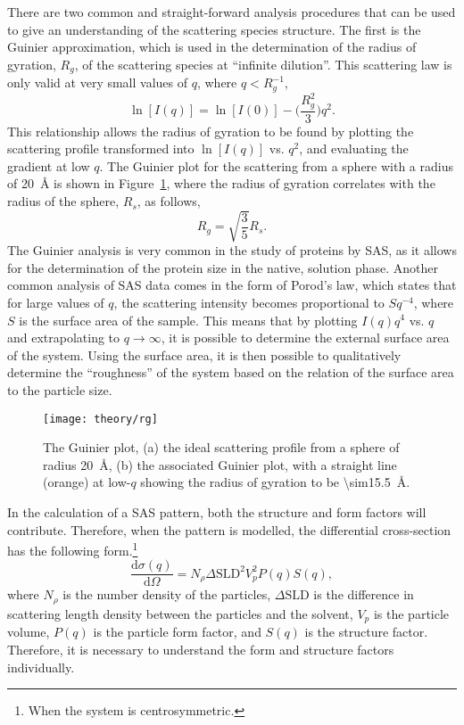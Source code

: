 There are two common and straight-forward analysis procedures that can be used to give an understanding of the scattering species structure.
The first is the Guinier approximation, which is used in the determination of the radius of gyration, $R_g$, of the scattering species at ``infinite dilution''.
This scattering law is only valid at very small values of $q$, where $q < R_g^{-1}$,\autocite{sivia_elementary_2011}
%
\begin{equation}
    \ln[I(q)] = \ln[I(0)] - \Bigg(\frac{R_g^2}{3}\Bigg)q^2.
\end{equation}
%
This relationship allows the radius of gyration to be found by plotting the scattering profile transformed into $\ln[I(q)]$ vs. $q^2$, and evaluating the gradient at low $q$.
The Guinier plot for the scattering from a sphere with a radius of \SI{20}{\angstrom} is shown in Figure~\ref{fig:rg}, where the radius of gyration correlates with the radius of the sphere, $R_s$, as follows,
%
\begin{equation}
    R_g = \sqrt{\frac{3}{5}}R_s.
\end{equation}
%
The Guinier analysis is very common in the study of proteins by SAS, as it allows for the determination of the protein size in the native, solution phase.\autocite{skou_synchrotron-based_2014}
Another common analysis of SAS data comes in the form of Porod's law, which states that for large values of $q$, the scattering intensity becomes proportional to $Sq^{-4}$, where $S$ is the surface area of the sample.
This means that by plotting $I(q)q^4$ vs. $q$ and extrapolating to $q \rightarrow \infty$, it is possible to determine the external surface area of the system.\autocite{willis_experimental_2009}
Using the surface area, it is then possible to qualitatively determine the ``roughness'' of the system based on the relation of the surface area to the particle size.
%
\begin{figure}[t]
    \centering
    \texttt{[image: theory/rg]}
    \caption{The Guinier plot, (a) the ideal scattering profile from a sphere of radius \SI{20}{\angstrom}, (b) the associated Guinier plot, with a straight line (orange) at low-$q$ showing the radius of gyration to be \SI{\sim15.5}{\angstrom}.}
    \label{fig:rg}
\end{figure}
%

In the calculation of a SAS pattern, both the structure and form factors will contribute.
Therefore, when the pattern is modelled, the differential cross-section has the following form.\footnote{When the system is centrosymmetric.}
%
\begin{equation}
    \frac{\text{d}\sigma(q)}{\text{d}\Omega} = N_\rho\Delta\text{SLD}^2V_p^2 P(q)S(q),
\end{equation}
%
where $N_\rho$ is the number density of the particles, $\Delta\text{SLD}$ is the difference in scattering length density between the particles and the solvent, $V_p$ is the particle volume, $P(q)$ is the particle form factor, and $S(q)$ is the structure factor.\autocite{pedersen_monte_2002}
Therefore, it is necessary to understand the form and structure factors individually.

